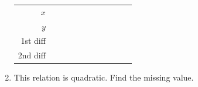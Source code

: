 \documentclass[11pt]{article}
\begin{document}
\begin{recapbox}
\begin{multicols}{2}
\begin{enumerate}[leftmargin=*,itemsep=3pt]
\begin{center}\renewcommand{\arraystretch}{1.15}\setlength{\tabcolsep}{2pt}\begin{tabular}{r|>{\centering\arraybackslash}p{0.62cm}>{\centering\arraybackslash}p{0.62cm}>{\centering\arraybackslash}p{0.62cm}>{\centering\arraybackslash}p{0.62cm}>{\centering\arraybackslash}p{0.62cm}>{\centering\arraybackslash}p{0.62cm}>{\centering\arraybackslash}p{0.62cm}>{\centering\arraybackslash}p{0.62cm}>{\centering\arraybackslash}p{0.62cm}>{\centering\arraybackslash}p{0.62cm}}
$x$ & \multicolumn{2}{c}{\colorbox{iagreen}{\makebox[1.12cm]{\strut \color{white}\bfseries $-2$}}} & \multicolumn{2}{c}{\colorbox{iagreen}{\makebox[1.12cm]{\strut \color{white}\bfseries $-1$}}} & \multicolumn{2}{c}{\colorbox{iagreen}{\makebox[1.12cm]{\strut \color{white}\bfseries $0$}}} & \multicolumn{2}{c}{\colorbox{iagreen}{\makebox[1.12cm]{\strut \color{white}\bfseries $1$}}} & \multicolumn{2}{c}{\colorbox{iagreen}{\makebox[1.12cm]{\strut \color{white}\bfseries $2$}}} \\[2pt]
$y$ & \multicolumn{2}{c}{\fbox{\makebox[0.94cm]{\strut}}} & \multicolumn{2}{c}{\fbox{\makebox[0.94cm]{\strut}}} & \multicolumn{2}{c}{\fbox{\makebox[0.94cm]{\strut}}} & \multicolumn{2}{c}{\fbox{\makebox[0.94cm]{\strut}}} & \multicolumn{2}{c}{\fbox{\makebox[0.94cm]{\strut}}} \\[2pt]
\textcolor{exblue}{\scriptsize 1st diff} & & \multicolumn{2}{c}{\fbox{\makebox[0.94cm]{\strut}}} & \multicolumn{2}{c}{\fbox{\makebox[0.94cm]{\strut}}} & \multicolumn{2}{c}{\fbox{\makebox[0.94cm]{\strut}}} & \multicolumn{2}{c}{\fbox{\makebox[0.94cm]{\strut}}} & \\[2pt]
\textcolor{qorange}{\scriptsize 2nd diff} & & & \multicolumn{2}{c}{\fbox{\makebox[0.94cm]{\strut}}} & \multicolumn{2}{c}{\fbox{\makebox[0.94cm]{\strut}}} & \multicolumn{2}{c}{\fbox{\makebox[0.94cm]{\strut}}} & & \\
\end{tabular}\end{center}
  \item This relation is quadratic. Find the missing value.
\begin{center}\renewcommand{\arraystretch}{1.15}\setlength{\tabcolsep}{2pt}\begin{tabular}{r|>{\centering\arraybackslash}p{0.62cm}>{\centering\arraybackslash}p{0.62cm}>{\centering\arraybackslash}p{0.62cm}>{\centering\arraybackslash}p{0.62cm}>{\centering\arraybackslash}p{0.62cm}>{\centering\arraybackslash}p{0.62cm}>{\centering\arraybackslash}p{0.62cm}>{\centering\arraybackslash}p{0.62cm}>{\centering\arraybackslash}p{0.62cm}>{\centering\arraybackslash}p{0.62cm}>{\centering\arraybackslash}p{0.62cm}>{\centering\arraybackslash}p{0.62cm}}

\end{tabular}
\end{center}
\end{enumerate}
\end{multicols}
\end{recapbox}
\end{document}
